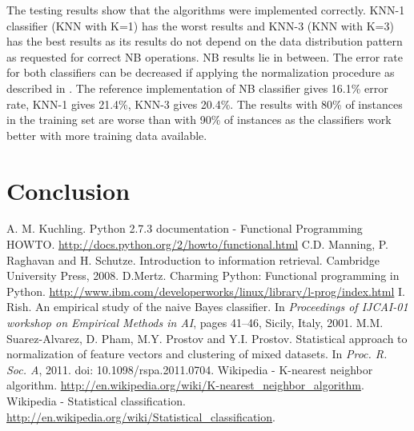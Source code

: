 \documentclass{llncs}
\begin{document}
The testing results show that the algorithms were implemented correctly. KNN-1 classifier (KNN with K=1) has the worst results and KNN-3 (KNN with K=3) has the best results as its results do not depend on the data distribution pattern as requested for correct NB operations. NB results lie in between. The error rate for both classifiers can be decreased if applying the normalization procedure as described in \cite{Suarez}. The reference implementation of NB classifier gives 16.1\% error rate, KNN-1 gives 21.4\%, KNN-3 gives 20.4\%. The results with 80\% of instances in the training set are worse than with 90\% of instances as the classifiers work better with more training data available.



\section{Conclusion}

\begin{thebibliography}{99}
 A. M. Kuchling. Python 2.7.3 documentation - Functional Programming HOWTO. \url{http://docs.python.org/2/howto/functional.html}
 C.D. Manning, P. Raghavan and H. Schutze. Introduction to information retrieval.  Cambridge University Press, 2008. 
 D.Mertz. Charming Python: Functional programming in Python. \url{http://www.ibm.com/developerworks/linux/library/l-prog/index.html}
 I. Rish. An empirical study of the naive Bayes classifier. In \emph{Proceedings of IJCAI-01 workshop on Empirical Methods in AI}, pages 41--46, Sicily, Italy, 2001.
 M.M. Suarez-Alvarez, D. Pham, M.Y. Prostov and Y.I. Prostov. Statistical approach to normalization of feature vectors and clustering of mixed datasets. In \emph{Proc. R. Soc. A}, 2011. doi: 10.1098/rspa.2011.0704. 
 Wikipedia - K-nearest neighbor algorithm. \url{http://en.wikipedia.org/wiki/K-nearest\_neighbor\_algorithm}.
 Wikipedia - Statistical classification. \url{http://en.wikipedia.org/wiki/Statistical\_classification}. 
\end{thebibliography}
\end{document}
